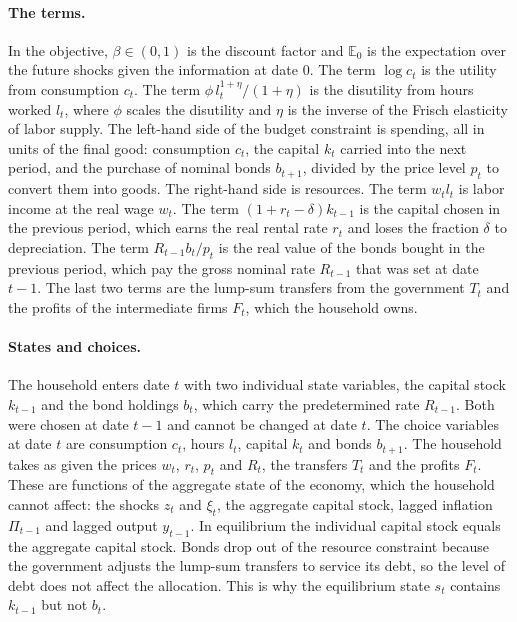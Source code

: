 \documentclass[11pt]{article}
\begin{document}
\paragraph{The terms.} In the objective, $\beta \in (0,1)$ is the discount factor and $\mathbb{E}_0$ is the expectation over the future shocks given the information at date 0. The term $\log c_t$ is the utility from consumption $c_t$. The term $\phi\, l_t^{1+\eta}/(1+\eta)$ is the disutility from hours worked $l_t$, where $\phi$ scales the disutility and $\eta$ is the inverse of the Frisch elasticity of labor supply. The left-hand side of the budget constraint is spending, all in units of the final good: consumption $c_t$, the capital $k_t$ carried into the next period, and the purchase of nominal bonds $b_{t+1}$, divided by the price level $p_t$ to convert them into goods. The right-hand side is resources. The term $w_t l_t$ is labor income at the real wage $w_t$. The term $(1 + r_t - \delta) k_{t-1}$ is the capital chosen in the previous period, which earns the real rental rate $r_t$ and loses the fraction $\delta$ to depreciation. The term $R_{t-1} b_t/p_t$ is the real value of the bonds bought in the previous period, which pay the gross nominal rate $R_{t-1}$ that was set at date $t-1$. The last two terms are the lump-sum transfers from the government $T_t$ and the profits of the intermediate firms $F_t$, which the household owns.

\paragraph{States and choices.} The household enters date $t$ with two individual state variables, the capital stock $k_{t-1}$ and the bond holdings $b_t$, which carry the predetermined rate $R_{t-1}$. Both were chosen at date $t-1$ and cannot be changed at date $t$. The choice variables at date $t$ are consumption $c_t$, hours $l_t$, capital $k_t$ and bonds $b_{t+1}$. The household takes as given the prices $w_t$, $r_t$, $p_t$ and $R_t$, the transfers $T_t$ and the profits $F_t$. These are functions of the aggregate state of the economy, which the household cannot affect: the shocks $z_t$ and $\xi_t$, the aggregate capital stock, lagged inflation $\Pi_{t-1}$ and lagged output $y_{t-1}$. In equilibrium the individual capital stock equals the aggregate capital stock. Bonds drop out of the resource constraint because the government adjusts the lump-sum transfers to service its debt, so the level of debt does not affect the allocation. This is why the equilibrium state $s_t$ contains $k_{t-1}$ but not $b_t$.
\end{document}
